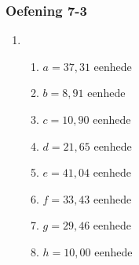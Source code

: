 {\begin{multicols}{3}
\begin{enumerate}[noitemsep, label=\textbf{\arabic*}. ]
% 
\end{enumerate}
\subsubsection*{Oefening 7-3} %
\begin{enumerate}[noitemsep, label=\textbf{\arabic*}. ]
\item %
      \begin{enumerate}[noitemsep, label=\textbf{(\alph*)} ]
      
\item $a=37,31$ eenhede
\item $b=8,91$ eenhede
\item $c=10,90$ eenhede
\item $d=21,65$ eenhede
\item $e=41,04$ eenhede
\item $f=33,43$ eenhede
\item $g=29,46$ eenhede
\item $h=10,00$ eenhede
      \end{enumerate}



\end{enumerate}
\end{multicols}}
